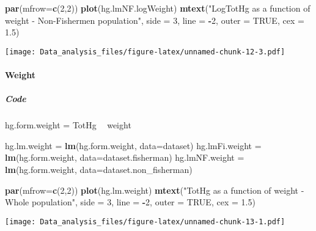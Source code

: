 \documentclass[12pt,]{article}
\newenvironment{Shaded}{\begin{snugshade}}{\end{snugshade}}
\newcommand{\KeywordTok}[1]{\textcolor[rgb]{0.13,0.29,0.53}{\textbf{#1}}}
\newcommand{\DataTypeTok}[1]{\textcolor[rgb]{0.13,0.29,0.53}{#1}}
\newcommand{\DecValTok}[1]{\textcolor[rgb]{0.00,0.00,0.81}{#1}}
\newcommand{\FloatTok}[1]{\textcolor[rgb]{0.00,0.00,0.81}{#1}}
\newcommand{\StringTok}[1]{\textcolor[rgb]{0.31,0.60,0.02}{#1}}
\newcommand{\OtherTok}[1]{\textcolor[rgb]{0.56,0.35,0.01}{#1}}
\newcommand{\OperatorTok}[1]{\textcolor[rgb]{0.81,0.36,0.00}{\textbf{#1}}}
\newcommand{\NormalTok}[1]{#1}
\let\oldparagraph\paragraph
\renewcommand{\paragraph}[1]{\oldparagraph{#1}\mbox{}}
\let\oldsubparagraph\subparagraph
\renewcommand{\subparagraph}[1]{\oldsubparagraph{#1}\mbox{}}
\begin{document}
\begin{Shaded}
\begin{Highlighting}[]
\KeywordTok{par}\NormalTok{(}\DataTypeTok{mfrow=}\KeywordTok{c}\NormalTok{(}\DecValTok{2}\NormalTok{,}\DecValTok{2}\NormalTok{))}
\KeywordTok{plot}\NormalTok{(hg.lmNF.logWeight)}
\KeywordTok{mtext}\NormalTok{(}\StringTok{"LogTotHg as a function of weight - Non-Fishermen population"}\NormalTok{, }\DataTypeTok{side =} \DecValTok{3}\NormalTok{, }\DataTypeTok{line =} \OperatorTok{-}\DecValTok{2}\NormalTok{, }\DataTypeTok{outer =} \OtherTok{TRUE}\NormalTok{, }\DataTypeTok{cex =} \FloatTok{1.5}\NormalTok{)}
\end{Highlighting}
\end{Shaded}

\texttt{[image: Data\_analysis\_files/figure-latex/unnamed-chunk-12-3.pdf]}

\paragraph{Weight}\label{weight}

\subparagraph{Code}\label{code-2}

\begin{Shaded}
\begin{Highlighting}[]
\NormalTok{hg.form.weight =}\StringTok{ }\NormalTok{TotHg }\OperatorTok{~}\StringTok{ }\NormalTok{weight}

\NormalTok{hg.lm.weight =}\StringTok{ }\KeywordTok{lm}\NormalTok{(hg.form.weight, }\DataTypeTok{data=}\NormalTok{dataset)}
\NormalTok{hg.lmFi.weight =}\StringTok{ }\KeywordTok{lm}\NormalTok{(hg.form.weight, }\DataTypeTok{data=}\NormalTok{dataset.fisherman)}
\NormalTok{hg.lmNF.weight =}\StringTok{ }\KeywordTok{lm}\NormalTok{(hg.form.weight, }\DataTypeTok{data=}\NormalTok{dataset.non_fisherman)}

\KeywordTok{par}\NormalTok{(}\DataTypeTok{mfrow=}\KeywordTok{c}\NormalTok{(}\DecValTok{2}\NormalTok{,}\DecValTok{2}\NormalTok{))}
\KeywordTok{plot}\NormalTok{(hg.lm.weight)}
\KeywordTok{mtext}\NormalTok{(}\StringTok{"TotHg as a function of weight - Whole population"}\NormalTok{, }\DataTypeTok{side =} \DecValTok{3}\NormalTok{, }\DataTypeTok{line =} \OperatorTok{-}\DecValTok{2}\NormalTok{, }\DataTypeTok{outer =} \OtherTok{TRUE}\NormalTok{, }\DataTypeTok{cex =} \FloatTok{1.5}\NormalTok{)}
\end{Highlighting}
\end{Shaded}

\texttt{[image: Data\_analysis\_files/figure-latex/unnamed-chunk-13-1.pdf]}
\end{document}
